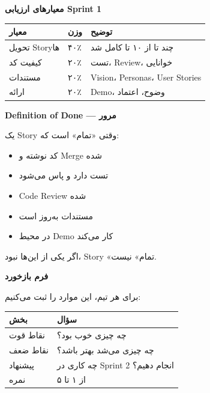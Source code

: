 \documentclass[14pt, a4paper, landscape]{extarticle}
\newcommand{\slide}[1]{%
    \newpage
    \begin{center}
    \begin{minipage}[t]{0.95\textwidth}
    \vspace{0.5cm}
    #1
    \vspace{0.5cm}
    \end{minipage}
    \end{center}
}
\newcommand{\slidetitle}[1]{%
    \begin{center}
        {\LARGE\bfseries\textcolor{primary}{#1}}
    \end{center}
    \vspace{0.5cm}
}
\newcommand{\myaccent}[1]{\textcolor{accent}{#1}}
\begin{document}
\slide{
    \slidetitle{معیارهای ارزیابی Sprint 1}
    \vspace{0.5cm}
    \begin{center}
        \begin{tabular}{p{5cm}p{3cm}p{4cm}}
            \toprule
            \textbf{معیار} & \textbf{وزن} & \textbf{توضیح} \\
            \midrule
            تحویل Storyها & ۴۰٪ & چند تا از ۱۰ تا کامل شد \\
            \hline
            کیفیت کد & ۲۰٪ & تست، Review، خوانایی \\
            \hline
            مستندات & ۲۰٪ & Vision، Personas، User Stories \\
            \hline
            ارائه & ۲۰٪ & Demo، وضوح، اعتماد \\
            \bottomrule
        \end{tabular}
    \end{center}
}

\slide{
    \slidetitle{Definition of Done — مرور}
    \vspace{0.5cm}
    {\large یک Story وقتی «تمام» است که:}
    \vspace{0.5cm}
    \begin{itemize}[itemsep=0.5em]
        \item کد نوشته و Merge شده
        \item تست دارد و پاس می‌شود
        \item Code Review شده
        \item مستندات به‌روز است
        \item در محیط Demo کار می‌کند
    \end{itemize}
    \vspace{0.8cm}
    \begin{center}
        {\myaccent{اگر یکی از این‌ها نبود، Story «تمام» نیست.}}
    \end{center}
}

\slide{
    \slidetitle{فرم بازخورد}
    \vspace{0.5cm}
    {\large برای هر تیم، این موارد را ثبت می‌کنیم:}
    \vspace{0.5cm}
    \begin{center}
        \begin{tabular}{lp{9cm}}
            \toprule
            \textbf{بخش} & \textbf{سؤال} \\
            \midrule
            نقاط قوت & چه چیزی خوب بود؟ \\
            \hline
            نقاط ضعف & چه چیزی می‌شد بهتر باشد؟ \\
            \hline
            پیشنهاد & چه کاری در Sprint 2 انجام دهیم؟ \\
            \hline
            نمره & از ۱ تا ۵ \\
            \bottomrule
        \end{tabular}
    \end{center}
}
\end{document}
